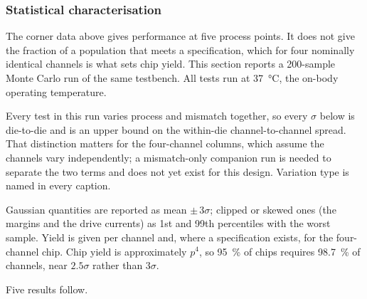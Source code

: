 %

\subsubsection{Statistical characterisation}\label{sss:ctrlamp-mc}

The corner data above gives performance at five process points. It does not give the
fraction of a population that meets a specification, which for four nominally identical
channels is what sets chip yield. This section reports a 200-sample Monte Carlo run of
the same testbench. All tests run at
\SI{37}{\celsius}, the on-body operating temperature.

Every test in this run varies process and mismatch together, so every $\sigma$ below is die-to-die and is an upper bound on
the within-die channel-to-channel spread. That distinction matters for the four-channel
columns, which assume the channels vary independently; a mismatch-only companion run is needed to separate the two terms and does
not yet exist for this design. Variation type is named in every caption.

Gaussian quantities are reported as mean $\pm\,3\sigma$; clipped or skewed ones
(the margins and the drive currents) as 1st and 99th percentiles with the worst
sample. Yield is given per channel and, where a specification exists, for the
four-channel chip. Chip yield is approximately $p^4$, so \SI{95}{\percent} of chips
requires \SI{98.7}{\percent} of channels, near \(2.5\sigma\) rather than \(3\sigma\).

Five results follow.

